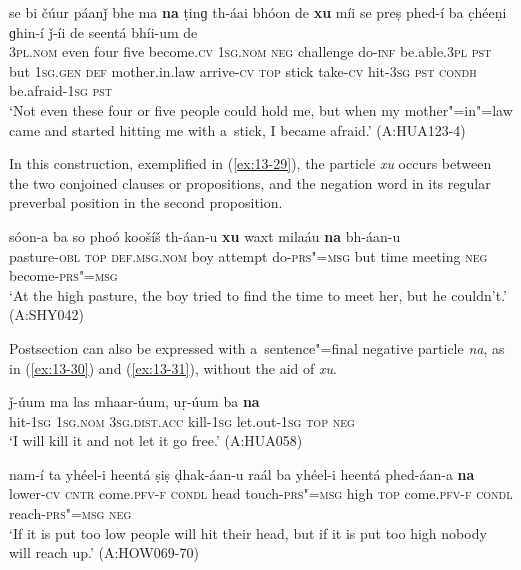 \ea
\label{ex:13-28}
\gll se bi čúur páanǰ bhe ma \textbf{na} ṭinɡ th-áai bhóon de \textbf{xu} míi se preṣ phed-í ba c̣héeṇi ɡhin-í ǰ-íi de seentá bhíi-um de\\
\textsc{3pl.nom} even four five become.\textsc{cv} \textsc{1sg.nom} \textsc{neg}  challenge do-\textsc{inf} be.able.\textsc{3pl} \textsc{pst} but \textsc{1sg.gen}  \textsc{def} mother.in.law arrive-\textsc{cv} \textsc{top} stick take-\textsc{cv} hit-\textsc{3sg} \textsc{pst} \textsc{condh} be.afraid-\textsc{1sg} \textsc{pst}\\
\glt `Not even these four or five people could hold me, but when my mother"=in"=law came and started hitting me with a~stick, I became afraid.' (A:HUA123-4) 
\z

 In this construction, exemplified in (\ref{ex:13-29}), the particle \textit{xu} occurs between the two conjoined clauses or propositions, and the negation word in its regular preverbal position in the second proposition.

\begin{exe}
\ex
\label{ex:13-29}
\gll sóon-a ba so phoó koošíš th-áan-u \textbf{xu} waxt milaáu \textbf{na} bh-áan-u \\
pasture-\textsc{obl} \textsc{top} \textsc{def.msg.nom} boy attempt   do-\textsc{prs"=msg} but time meeting \textsc{neg} become-\textsc{prs"=msg} \\
\glt `At the high pasture, the boy tried to find the time to meet her, but he couldn't.' (A:SHY042) 
\end{exe}

 Postsection can also be expressed with a~sentence"=final negative particle \textit{na}, as in (\ref{ex:13-30}) and (\ref{ex:13-31}), without the aid of \textit{xu}. 

\begin{exe}
\ex
\label{ex:13-30}
\gll ǰ-úum ma las mhaar-úum, uṛ-úum ba \textbf{na}\\
hit-\textsc{1sg} \textsc{1sg.nom} \textsc{3sg.dist.acc} kill-\textsc{1sg} let.out-\textsc{1sg}
\textsc{top} \textsc{neg} \\
\glt `I will kill it and not let it go free.' (A:HUA058)

\ex
\label{ex:13-31}
\gll nam-í ta yhéel-i heentá ṣiṣ ḍhak-áan-u raál ba yhéel-i heentá phed-áan-a \textbf{na} \\
lower-\textsc{cv} \textsc{cntr} come.\textsc{pfv-f} \textsc{condl} head touch-\textsc{prs"=msg}  high \textsc{top} come.\textsc{pfv-f} \textsc{condl} reach-\textsc{prs"=msg} \textsc{neg} \\
\glt `If it is put too low people will hit their head, but if it is put too high nobody will reach up.' (A:HOW069-70)
\end{exe}

